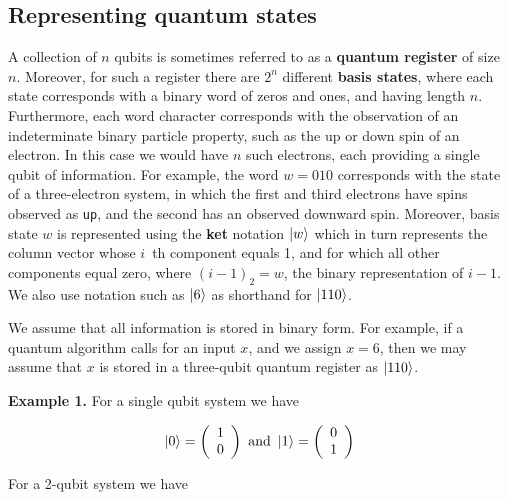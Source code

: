 \documentclass [12pt]{article}
\theoremstyle{definition}
\begin{document}
\subsection*{Representing quantum states}

A collection of $n$ qubits is sometimes referred to as a \textbf{quantum register} of size $n$. Moreover, for such a register
there are $2^n$ different \textbf{basis states}, where each state corresponds with a binary word of zeros and ones, and having length $n$. Furthermore, each 
word character corresponds with the observation of an indeterminate binary particle property, such as the up or down spin of an electron. In this case we would have $n$ such electrons,
each providing a single qubit of information. For example, the word $w=010$ corresponds with the state of a three-electron system, in which the first and third electrons
have spins observed as \texttt{up}, and the second has an observed downward spin. Moreover, basis state $w$ is represented using
the  \textbf{ket} notation $\ket{w}$ which in turn represents 
the column vector whose $i$~th component equals 1, and for which all other components equal zero, where $(i-1)_2 = w$, the binary representation of $i-1$.
We also use notation such as $\ket{6}$ as shorthand for $\ket{110}$. 

We assume that all information is stored in binary form. For example, if a quantum algorithm calls for an input $x$, and we assign $x=6$, then we may assume that $x$ is stored
in a three-qubit quantum register as $\ket{110}$.

\newpage
\textbf{Example 1.} For a single qubit system we have

\[
\ket{0}=\left(\begin{array}{c}
1\\
0 \\
\end{array}\right)\mbox{ and }
\ket{1}=\left(\begin{array}{c}
0\\
1 \\
\end{array}\right)
\]

For a 2-qubit system we have 
\end{document}
